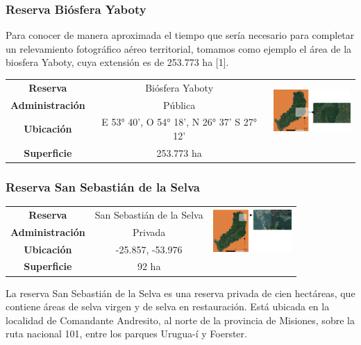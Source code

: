\subsubsection{Reserva Biósfera Yaboty}
Para conocer de manera aproximada el tiempo que sería necesario para completar un relevamiento fotográfico aéreo territorial, tomamos como ejemplo el área de la biosfera Yaboty, cuya extensión es de 253.773 ha [1].
\begin{table}[H]
    \centering
    \begin{tabular}{|c|c|c|}
        \hline
        \textbf{Reserva} & Biósfera Yaboty &   \multirow{ 3}{*}{\includegraphics[width=30mm]{Imagenes/Yaboty.png}}\\ 
        \textbf{Administración} & Pública\\
        \textbf{Ubicación} & E 53° 40’, O 54° 18’, N 26° 37’ S 27° 12’ \\
        \textbf{Superficie} & 253.773 ha\\
        \hline
    \end{tabular}
    \label{Yaboty}
\end{table}
\subsubsection{Reserva San Sebastián de la Selva}
\begin{table}[H]
\centering
\begin{tabular}{|c|c|c|}
\hline
 \textbf{Reserva} & San Sebastián de la Selva &   \multirow{ 3}{*}{\includegraphics[width=30mm]{Imagenes/San Sebastian.png}}\\ 
\textbf{Administración} & Privada\\
        
        \textbf{Ubicación} & -25.857, -53.976 \\
         
        \textbf{Superficie} & 92 ha\\
\hline        
\end{tabular}

\label{Profundidad}
\end{table}
La reserva San Sebastián de la Selva es una reserva privada de cien hectáreas, que contiene áreas de selva virgen y de selva en restauración. Está ubicada en la localidad de Comandante Andresito, al norte de la provincia de Misiones, sobre la ruta nacional 101, entre los parques Urugua-í y Foerster. 
